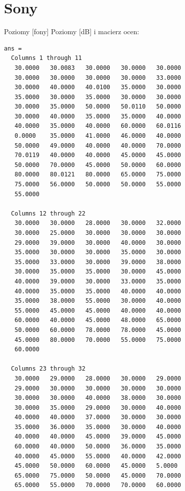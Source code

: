 \documentclass[12pt]{article}
\begin{document}
\newpage
\section{Sony}
Poziomy [fony] Poziomy [dB] i macierz ocen:
\begin{verbatim}
ans =
  Columns 1 through 11
   30.0000   30.0083   30.0000   30.0000   30.0000   
   30.0000   30.0000   30.0000   30.0000   33.0000   
   30.0000   40.0000   40.0100   35.0000   30.0000   
   35.0000   30.0000   35.0000   30.0000   30.0000   
   30.0000   35.0000   50.0000   50.0110   50.0000   
   30.0000   40.0000   35.0000   35.0000   40.0000   
   40.0000   35.0000   40.0000   60.0000   60.0116   
   0.0000    35.0000   41.0000   46.0000   40.0000   
   50.0000   49.0000   40.0000   40.0000   70.0000   
   70.0119   40.0000   40.0000   45.0000   45.0000   
   50.0000   70.0000   45.0000   50.0000   60.0000
   80.0000   80.0121   80.0000   65.0000   75.0000   
   75.0000   56.0000   50.0000   50.0000   55.0000   
   55.0000

  Columns 12 through 22
   30.0000   30.0000   28.0000   30.0000   32.0000   
   30.0000   25.0000   30.0000   30.0000   30.0000   
   29.0000   39.0000   30.0000   40.0000   30.0000   
   35.0000   30.0000   30.0000   35.0000   30.0000   
   35.0000   33.0000   30.0000   39.0000   38.0000   
   30.0000   35.0000   35.0000   30.0000   45.0000   
   40.0000   39.0000   30.0000   33.0000   35.0000   
   40.0000   35.0000   35.0000   40.0000   40.0000   
   35.0000   38.0000   55.0000   30.0000   40.0000   
   55.0000   45.0000   45.0000   40.0000   40.0000   
   60.0000   40.0000   45.0000   48.0000   65.0000
   50.0000   60.0000   78.0000   78.0000   45.0000   
   45.0000   80.0000   70.0000   55.0000   75.0000   
   60.0000

  Columns 23 through 32
   30.0000   29.0000   28.0000   30.0000   29.0000   
   29.0000   30.0000   30.0000   30.0000   30.0000
   30.0000   30.0000   40.0000   38.0000   30.0000   
   30.0000   35.0000   29.0000   30.0000   40.0000
   40.0000   40.0000   37.0000   30.0000   30.0000   
   35.0000   36.0000   35.0000   30.0000   40.0000
   40.0000   40.0000   45.0000   39.0000   45.0000   
   60.0000   40.0000   50.0000   36.0000   35.0000
   40.0000   45.0000   55.0000   40.0000   42.0000   
   45.0000   50.0000   60.0000   45.0000   5.0000
   65.0000   75.0000   50.0000   45.0000   70.0000   
   65.0000   55.0000   70.0000   70.0000   60.0000
\end{verbatim}
\end{document}
